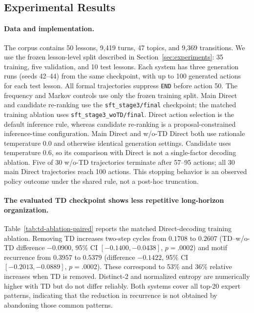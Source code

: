 \documentclass[manuscript,review,anonymous]{acmart}
\begin{document}
\subsection{Experimental Results}

\paragraph{Data and implementation.}
The corpus contains 50 lessons, 9,419 turns, 47 topics, and 9,369
transitions. We use the frozen lesson-level split described in
Section~\ref{sec:experiments}: 35 training, five validation, and 10 test
lessons. Each system has three generation runs (seeds 42--44) from the same
checkpoint, with up to 100 generated actions for each test lesson. All formal trajectories suppress \texttt{END}
before action 50. The frequency and Markov controls use only the frozen
training split. Main Direct and candidate re-ranking use the
\texttt{sft\_stage3/final} checkpoint; the matched training ablation uses
\texttt{sft\_stage3\_woTD/final}. Direct action selection is the default
inference rule, whereas candidate re-ranking is a proposal-constrained
inference-time configuration. Main Direct and w/o-TD Direct both use rationale
temperature 0.0 and otherwise identical generation settings. Candidate uses
temperature 0.6, so its comparison with Direct is not a single-factor decoding
ablation. Five of 30 w/o-TD trajectories terminate after 57--95 actions; all
30 main Direct trajectories reach 100 actions. This stopping behavior is an
observed policy outcome under the shared rule, not a post-hoc truncation.

\paragraph{The evaluated TD checkpoint shows less repetitive long-horizon organization.}
Table~\ref{tab:td-ablation-paired} reports the matched Direct-decoding training
ablation. Removing TD increases two-step cycles from $0.1708$ to $0.2607$
(TD--w/o-TD difference $-0.0900$, 95\% CI $[-0.1400,-0.0438]$,
$p=.0002$) and motif recurrence from $0.3957$ to $0.5379$ (difference
$-0.1422$, 95\% CI $[-0.2013,-0.0889]$, $p=.0002$). These correspond to
53\% and 36\% relative increases when TD is removed. Distinct-2 and normalized
entropy are numerically higher with TD but do not differ reliably. Both
systems cover all top-20 expert patterns, indicating that the reduction in
recurrence is not obtained by abandoning those common patterns.
\end{document}
